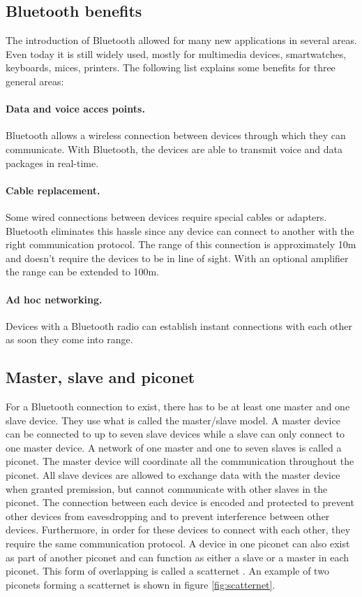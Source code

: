 \documentclass[a4paper, 11pt]{report}
\begin{document}
	\subsection{Bluetooth benefits}
The introduction of Bluetooth allowed for many new applications in several areas. Even today it is still widely used, mostly for multimedia devices, smartwatches, keyboards, mices, printers. The following list explains some benefits for three general areas:
		\paragraph{Data and voice acces points.}
Bluetooth allows a wireless connection between devices through which they can communicate. With Bluetooth, the devices are able to transmit voice and data packages in real-time.
		\paragraph{Cable replacement.}
Some wired connections between devices require special cables or adapters. Bluetooth eliminates this hassle since any device can connect to another with the right communication protocol. The range of this connection is approximately 10m and doesn't require the devices to be in line of sight. With an optional amplifier the range can be extended to 100m.
		\paragraph{Ad hoc networking.}
Devices with a Bluetooth radio can establish instant connections with each other as soon they come into range.


	\subsection{Master, slave and piconet}
For a Bluetooth connection to exist, there has to be at least one master and one slave device. They use what is called the master/slave model. A master device can be connected to up to seven slave devices while a slave can only connect to one master device. A network of one master and one to seven slaves is called a piconet. The master device will coordinate all the communication throughout the piconet. All slave devices are allowed to exchange data with the master device when granted premission, but cannot communicate with other slaves in the piconet. The connection between each device is encoded and protected to prevent other devices from eavesdropping and to prevent interference between other devices. Furthermore, in order for these devices to connect with each other, they require the same communication protocol. A device in one piconet can also exist as part of another piconet and can function as either a slave or a master in each piconet. This form of overlapping is called a scatternet \cite{introBluetooth}. An example of two piconets forming a scatternet is shown in figure \ref{fig:scatternet}.
\end{document}
